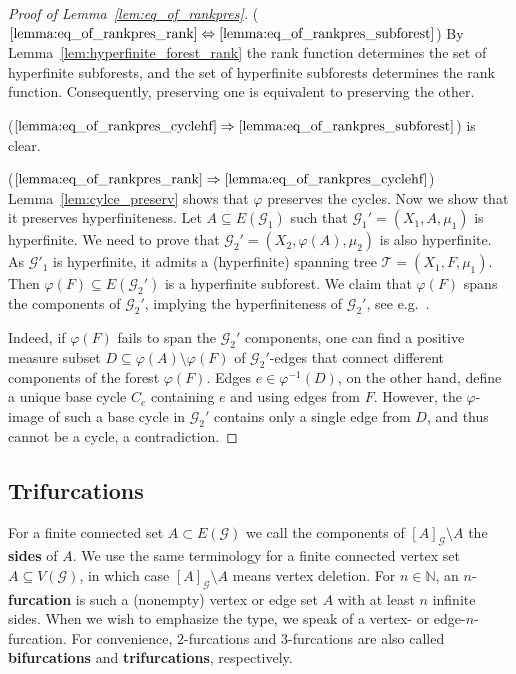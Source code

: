 \documentclass{article}
\theoremstyle{plain}
\theoremstyle{definition}
\newcommand{\N}{\mathbb{N}}
\newcommand{\cG}{\mathcal{G}}
\newcommand{\cT}{\mathcal{T}}
\newcommand{\fg}{\varphi}
\begin{document}
\begin{proof}[Proof of Lemma~\ref{lem:eq_of_rankpres}]
    
    ($\ref{lemma:eq_of_rankpres_rank}\Leftrightarrow\ref{lemma:eq_of_rankpres_subforest}$) 
    By Lemma~\ref{lem:hyperfinite_forest_rank} the rank function determines the set of hyperfinite subforests, and the set of hyperfinite subforests determines the rank function. Consequently, preserving one is equivalent to preserving the other.
    
    ($\ref{lemma:eq_of_rankpres_cyclehf}\Rightarrow\ref{lemma:eq_of_rankpres_subforest}$) is clear.

    ($\ref{lemma:eq_of_rankpres_rank}\Rightarrow\ref{lemma:eq_of_rankpres_cyclehf}$) Lemma~\ref{lem:cylce_preserv} shows that $\varphi$ preserves the cycles. Now we show that it preserves hyperfiniteness. Let $A \subseteq E(\cG_1)$ such that $\cG_1' = (X_1,A,\mu_1)$ is hyperfinite. We need to prove that $\cG_2'=(X_2, \varphi(A), \mu_2)$ is also hyperfinite. As $\cG'_1$ is hyperfinite, it admits a (hyperfinite) spanning tree $\cT=(X_1, F,\mu_1)$. Then $\fg(F)\subseteq E(\cG_2')$ is a hyperfinite subforest. We claim that $\fg(F)$ spans the components of $\cG_2'$, implying the hyperfiniteness of $\cG_2'$, see e.g.~\cite[Lemma 2.4]{Miller_ends}.

    Indeed, if $\varphi(F)$ fails to span the $\cG_2'$ components, one can find a positive measure subset $D \subseteq \varphi(A) \setminus \varphi(F)$ of $\cG_2'$-edges that connect different components of the forest $\varphi(F)$. Edges $e\in \varphi^{-1}(D)$, on the other hand, define a unique base cycle $C_e$ containing $e$ and using edges from $F$. 
    However, the $\varphi$-image of such a base cycle in $\cG_2'$ contains only a single edge from $D$, and thus cannot be a cycle, a contradiction.
\end{proof}
    
\subsection{Trifurcations}

For a finite connected set $A\subset E(\cG)$ we call the components of $[A]_{\cG}\setminus A$ the \textbf{sides} of $A$.  We use the same terminology for a finite connected vertex set $A\subseteq V(\cG)$, in which case
$[A]_{\cG}\setminus A$ means vertex deletion. For $n\in\N$, an $n$-\textbf{furcation} is such a (nonempty) vertex or edge set $A$ with at least $n$ infinite sides. When we wish to emphasize the
type, we speak of a vertex- or edge-$n$-furcation. For convenience, $2$-furcations and $3$-furcations are also called \textbf{bifurcations} and \textbf{trifurcations}, respectively.%
\end{document}

